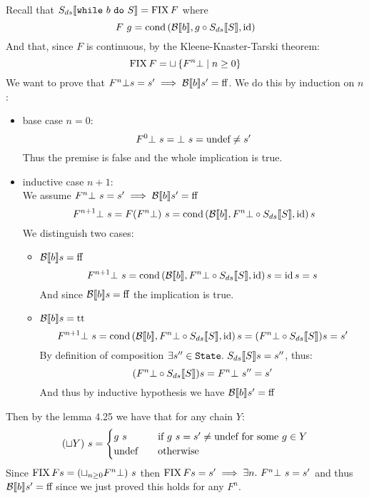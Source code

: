 \alternativeSolution
Recall that $S_{ds} \llbracket \texttt{while}\ b\ \texttt{do}\ S \rrbracket = \operatorname{FIX} F$ where
\[ F\ g= \operatorname{cond}\left(\mathcal{B} \llbracket b \rrbracket, g \circ S_{ds} \llbracket S \rrbracket, \operatorname{id}\right) \]
And that, since $F$ is continuous, by the Kleene-Knaster-Tarski theorem:
\[ \operatorname{FIX}{F} = \sqcup \left\{ F^n \bot \mid n \geq 0 \right\} \]
We want to prove that $F^n \bot s = s' \implies \mathcal{B} \llbracket b \rrbracket s' = \text{ff}$. We do this by induction on $n$:
\begin{itemize}
    \item base case $n = 0$:
        \[ F^0 \bot\ s = \bot\ s = \text{undef} \neq s' \]
        Thus the premise is false and the whole implication is true.
    \item inductive case $n + 1$: \\
        We assume $F^n \bot\ s = s' \implies \mathcal{B} \llbracket b \rrbracket s' = \text{ff}$
        \[ F^{n+1} \bot\ s = F(F^n \bot)\ s = \operatorname{cond}\left(\mathcal{B} \llbracket b \rrbracket, F^n \bot \circ S_{ds} \llbracket S \rrbracket, \operatorname{id}\right) s \]
        We distinguish two cases:
        \begin{itemize}
            \item $\mathcal{B} \llbracket b \rrbracket s = \text{ff}$
                \[ F^{n+1} \bot\ s = \operatorname{cond}\left(\mathcal{B} \llbracket b \rrbracket, F^n \bot \circ S_{ds} \llbracket S \rrbracket, \operatorname{id}\right) s = \operatorname{id} s = s \]
                And since $\mathcal{B} \llbracket b \rrbracket s = \text{ff}$ the implication is true.
            \item $\mathcal{B} \llbracket b \rrbracket s = \text{tt}$
                \[ F^{n+1} \bot\ s = \operatorname{cond}\left(\mathcal{B} \llbracket b \rrbracket, F^n \bot \circ S_{ds} \llbracket S \rrbracket, \operatorname{id}\right) s = (F^n \bot \circ S_{ds} \llbracket S \rrbracket) s = s' \]
                By definition of composition $\exists s'' \in \State.\ \Sds{S} s = s''$, thus:
                \[ (F^n \bot \circ S_{ds} \llbracket S \rrbracket) s = F^n \bot\ s'' = s' \]
                And thus by inductive hypothesis we have $\mathcal{B} \llbracket b \rrbracket s' = \text{ff}$
        \end{itemize}
\end{itemize}
Then by the lemma 4.25 we have that for any chain $Y$:
\[ (\sqcup Y)\ s = \begin{cases}
    g\ s &\quad \text{if } g\ s = s' \neq \text{undef} \text{ for some } g \in Y \\
    \text{undef} &\quad \text{otherwise}
\end{cases} \]
Since $\operatorname{FIX}{F} s = (\sqcup_{n \geq 0} F^n \bot)\ s$ then $\operatorname{FIX}{F} s = s' \implies \exists n.\ F^n \bot\ s = s'$ and thus $\mathcal{B} \llbracket b \rrbracket s' = \text{ff}$ since we just proved this holds for any $F^n$.
